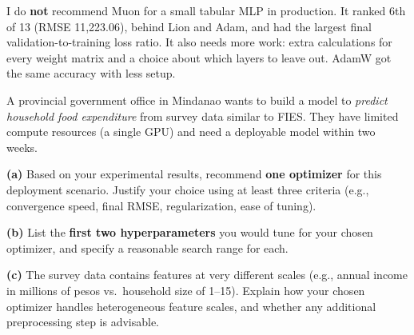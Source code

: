 \documentclass[12pt,a4paper]{article}
\begin{document}
\begin{answerbox}
I do \textbf{not} recommend Muon for a small tabular MLP in production. It ranked 6th of 13 (RMSE 11,223.06), behind Lion and Adam, and had the largest final validation-to-training loss ratio. It also needs more work: extra calculations for every weight matrix and a choice about which layers to leave out. AdamW got the same accuracy with less setup.

\end{answerbox}

\begin{tcolorbox}[colback=lightblue!40, colframe=myColorB,
  title={\textbf{Question 10 — Design Recommendation} \hfill \normalfont(10 pts)},
  fonttitle=\normalsize\bfseries, breakable]

A provincial government office in Mindanao wants to build a model to
\emph{predict household food expenditure} from survey data similar to FIES.
They have limited compute resources (a single GPU) and need a deployable
model within two weeks.

\textbf{(a)} Based on your experimental results, recommend \textbf{one optimizer}
for this deployment scenario. Justify your choice using at least three criteria
(e.g., convergence speed, final RMSE, regularization, ease of tuning).

\textbf{(b)} List the \textbf{first two hyperparameters} you would tune for your
chosen optimizer, and specify a reasonable search range for each.

\textbf{(c)} The survey data contains features at very different scales
(e.g., annual income in millions of pesos vs.\ household size of 1--15).
Explain how your chosen optimizer handles heterogeneous feature scales, and
whether any additional preprocessing step is advisable.
\end{tcolorbox}
\end{document}
